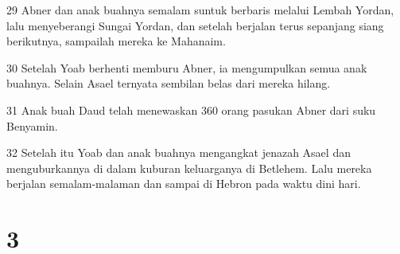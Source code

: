 \par 29 Abner dan anak buahnya semalam suntuk berbaris melalui Lembah Yordan, lalu menyeberangi Sungai Yordan, dan setelah berjalan terus sepanjang siang berikutnya, sampailah mereka ke Mahanaim.
\par 30 Setelah Yoab berhenti memburu Abner, ia mengumpulkan semua anak buahnya. Selain Asael ternyata sembilan belas dari mereka hilang.
\par 31 Anak buah Daud telah menewaskan 360 orang pasukan Abner dari suku Benyamin.
\par 32 Setelah itu Yoab dan anak buahnya mengangkat jenazah Asael dan menguburkannya di dalam kuburan keluarganya di Betlehem. Lalu mereka berjalan semalam-malaman dan sampai di Hebron pada waktu dini hari.

\chapter{3}

